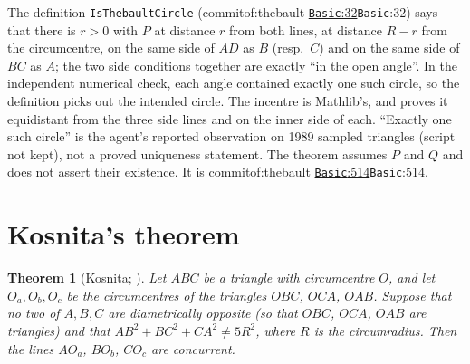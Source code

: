 \documentclass[11pt]{article}
\newtheorem{theorem}{Theorem}
\theoremstyle{definition}
\theoremstyle{remark}
\newcommand{\lean}[1]{\texttt{#1}}
\newcommand{\commitof}[1]{\csname commitof:#1\endcsname}
\newcommand{\repo}[1]{https://github.com/jpbald93/#1}
\newcommand{\src}[4]{\ifcsname commitof:#1\endcsname
  \href{\repo{#1}/blob/\commitof{#1}/#2/#3.lean\#L#4}{\texttt{#3}:#4}\else\texttt{#3}:#4\fi}
\begin{document}
The definition \lean{IsThebaultCircle} (\src{thebault}{Thebault3}{Basic}{32}) says that there is
$r>0$ with $P$ at distance $r$ from both lines, at distance $R-r$ from the circumcentre, on the same
side of $AD$ as $B$ (resp.\ $C$) and on the same side of $BC$ as $A$; the two side conditions
together are exactly ``in the open angle''. In the independent numerical check, each angle
contained exactly one such circle, so the definition picks out the intended circle. The incentre is Mathlib's, and
 proves it equidistant from the three side lines and on the inner
side of each. ``Exactly one such circle'' is the agent's reported observation on 1989 sampled triangles (script not kept), not a proved
uniqueness statement. The theorem assumes $P$ and $Q$ and does not assert their existence. It is
\src{thebault}{Thebault3}{Basic}{514}.

\section{Kosnita's theorem}\label{sec:kosnita}

\begin{theorem}[Kosnita; ]\label{thm:kosnita}
Let $ABC$ be a triangle with circumcentre $O$, and let $O_a,O_b,O_c$ be the circumcentres of the
triangles $OBC$, $OCA$, $OAB$. Suppose that no two of $A,B,C$ are diametrically opposite (so that
$OBC$, $OCA$, $OAB$ are triangles) and that $AB^2+BC^2+CA^2\neq 5R^2$, where $R$ is the circumradius.
Then the lines $AO_a$, $BO_b$, $CO_c$ are concurrent.
\end{theorem}
\end{document}
